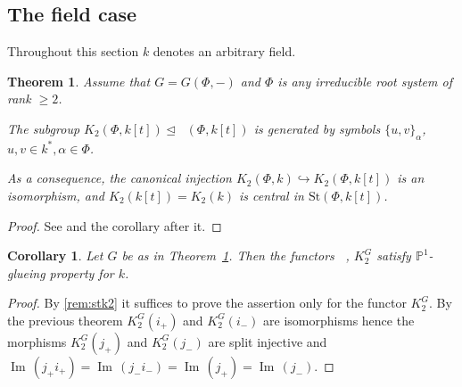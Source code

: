 \documentclass[oneside,12pt]{amsart}
\newtheorem{thm}{Theorem}
\numberwithin{equation}{section}
\numberwithin{lem}{section}
\newtheorem{cor}[lem]{Corollary}
\theoremstyle{definition}
\theoremstyle{remark}
\DeclareMathOperator{\St}{St^G}
\DeclareMathOperator{\im}{Im\,}
\newcommand{\Stb}{\mathrm{St}}
\newcommand{\Pro}{\mathbb{P}}
\begin{document}

\subsection{The field case}

Throughout this section $k$ denotes an arbitrary field.
\begin{thm} \label{thm:k[t]}
Assume that $G=G(\Phi, -)$ and $\Phi$ is any irreducible root system  of rank $\geq 2$.
\begin{thmlist}
\item \label{satz1} The subgroup $K_2(\Phi,k[t]) \trianglelefteq \St(\Phi,k[t])$
is generated by symbols $\{u,v\}_\alpha$, $u,v\in k^*,\alpha\in\Phi$.
\item As a consequence, the canonical injection $K_2(\Phi,k) \hookrightarrow K_2(\Phi,k[t])$ is an isomorphism,
and $K_2(k[t])=K_2(k)$ is central in $\Stb(\Phi,k[t])$.
\end{thmlist} \end{thm}
\begin{proof}
See \cite[Satz~1]{Re75} and the corollary after it.
\end{proof}

\begin{cor}\label{cor:k[t]inj}
Let $G$ be as in Theorem~\ref{thm:k[t]}. Then the functors $\St$, $K_2^G$ satisfy $\Pro^1$-glueing property for $k$. \end{cor}
\begin{proof} By \cref{rem:stk2} it suffices to prove the assertion only for the functor $K_2^G$.
By the previous theorem $K_2^G(i_+)$ and $K_2^G(i_-)$ are isomorphisms hence the morphisms $K_2^G(j_+)$ and $K_2^G(j_-)$ are split injective
and $\im(j_+i_+) = \im (j_-i_-) = \im(j_+) = \im(j_-)$.
\end{proof}
\end{document}

